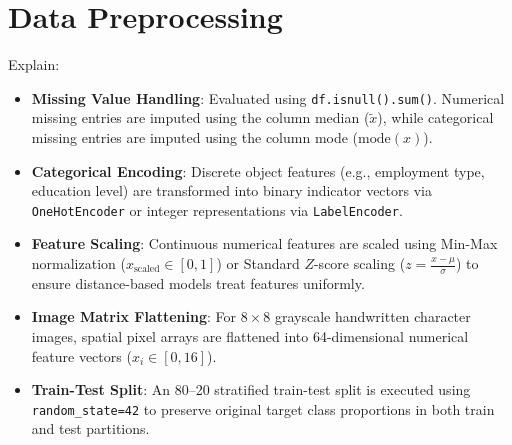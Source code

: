 \documentclass[12pt,a4paper]{article}
\begin{document}
\section{Data Preprocessing}
Explain:
\begin{itemize}
\item \textbf{Missing Value Handling}: Evaluated using \texttt{df.isnull().sum()}. Numerical missing entries are imputed using the column median ($\tilde{x}$), while categorical missing entries are imputed using the column mode ($\text{mode}(x)$).
\item \textbf{Categorical Encoding}: Discrete object features (e.g., employment type, education level) are transformed into binary indicator vectors via \texttt{OneHotEncoder} or integer representations via \texttt{LabelEncoder}.
\item \textbf{Feature Scaling}: Continuous numerical features are scaled using Min-Max normalization ($x_{\text{scaled}} \in [0,1]$) or Standard $Z$-score scaling ($z = \frac{x - \mu}{\sigma}$) to ensure distance-based models treat features uniformly.
\item \textbf{Image Matrix Flattening}: For $8 \times 8$ grayscale handwritten character images, spatial pixel arrays are flattened into 64-dimensional numerical feature vectors ($x_i \in [0, 16]$).
\item \textbf{Train-Test Split}: An 80--20 stratified train-test split is executed using \texttt{random\_state=42} to preserve original target class proportions in both train and test partitions.
\end{itemize}
\end{document}
